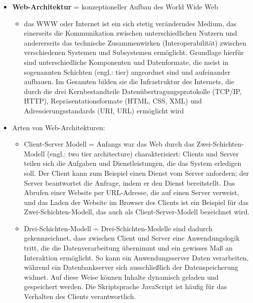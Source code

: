 \documentclass[11pt]{article}
\begin{document}
\begin{itemize}
\begin{itemize}
\begin{itemize}
\end{itemize}
\end{itemize}
\item \textbf{Web-Architektur} = konzeptioneller Aufbau des World Wide Web
\begin{itemize}
\item das WWW oder Internet ist ein sich stetig veränderndes Medium, das einerseits die Kommunikation zwischen unterschiedlichen Nutzern und andererseits das technische Zusammenwirken (Interoperabilität) zwischen verschiedenen Systemen und Subsystemen ermöglicht. Grundlage hierfür sind unterschiedliche Komponenten und Datenformate, die meist in sogenannten Schichten (engl.: tier) angeordnet sind und aufeinander aufbauen. Im Gesamten bilden sie die Infrastruktur des Internets, die durch die drei Kernbestandteile Datenübertragungsprotokolle (TCP/IP, HTTP), Repräsentationsformate (HTML, CSS, XML) und Adressierungsstandards (URI, URL) ermöglicht wird
\end{itemize}
\item Arten von Web-Architekturen:
\begin{itemize}
\item Client-Server Modell = Anfangs war das Web durch das Zwei-Schichten-Modell (engl.: two tier architecture) charakterisiert: Clients und Server teilen sich die Aufgaben und Dienstleistungen, die das System erledigen soll. Der Client kann zum Beispiel einen Dienst vom Server anfordern; der Server beantwortet die Anfrage, indem er den Dienst bereitstellt. Das Abrufen einer Website per URL-Adresse, die auf einen Server verweist, und das Laden der Website im Browser des Clients ist ein Beispiel für das Zwei-Schichten-Modell, das auch als Client-Server-Modell bezeichnet wird.
\item Drei-Schichten-Modell = Drei-Schichten-Modelle sind dadurch gekennzeichnet, dass zwischen Client und Server eine Anwendungslogik tritt, die die Datenverarbeitung übernimmt und ein gewisses Maß an Interaktion ermöglicht. So kann ein Anwendungsserver Daten verarbeiten, während ein Datenbankserver sich ausschließlich der Datenspeicherung widmet. Auf diese Weise können Inhalte dynamisch geladen und gespeichert werden. Die Skriptsprache JavaScript ist häufig für das Verhalten des Clients verantwortlich.

\end{itemize}
\end{itemize}
\end{document}

